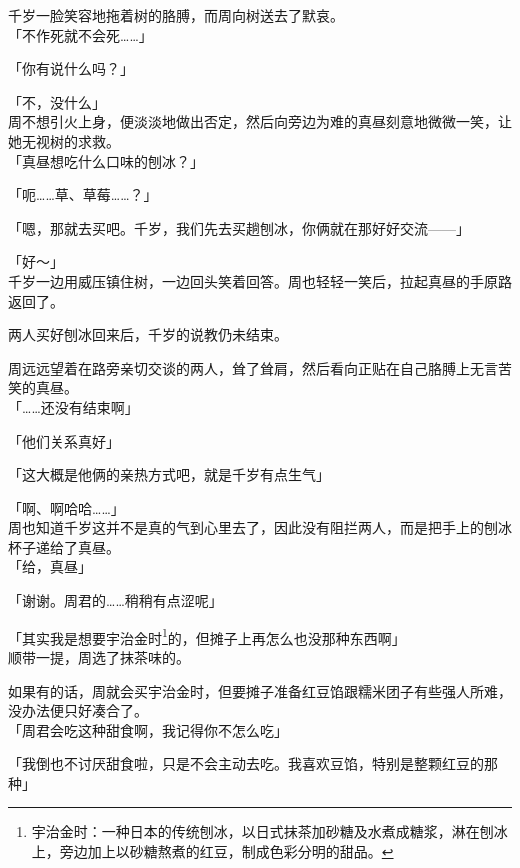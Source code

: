 千岁一脸笑容地拖着树的胳膊，而周向树送去了默哀。\\

「不作死就不会死……」

「你有说什么吗？」

「不，没什么」\\

周不想引火上身，便淡淡地做出否定，然后向旁边为难的真昼刻意地微微一笑，让她无视树的求救。\\

「真昼想吃什么口味的刨冰？」

「呃……草、草莓……？」

「嗯，那就去买吧。千岁，我们先去买趟刨冰，你俩就在那好好交流——」

「好～」\\

千岁一边用威压镇住树，一边回头笑着回答。周也轻轻一笑后，拉起真昼的手原路返回了。\\

\vspace{2\baselineskip}

两人买好刨冰回来后，千岁的说教仍未结束。

周远远望着在路旁亲切交谈的两人，耸了耸肩，然后看向正贴在自己胳膊上无言苦笑的真昼。\\

「……还没有结束啊」

「他们关系真好」

「这大概是他俩的亲热方式吧，就是千岁有点生气」

「啊、啊哈哈……」\\

周也知道千岁这并不是真的气到心里去了，因此没有阻拦两人，而是把手上的刨冰杯子递给了真昼。\\

「给，真昼」

「谢谢。周君的……稍稍有点涩呢」

「其实我是想要宇治金时\footnote{宇治金时：一种日本的传统刨冰，以日式抹茶加砂糖及水煮成糖浆，淋在刨冰上，旁边加上以砂糖熬煮的红豆，制成色彩分明的甜品。}的，但摊子上再怎么也没那种东西啊」\\

顺带一提，周选了抹茶味的。

如果有的话，周就会买宇治金时，但要摊子准备红豆馅跟糯米团子有些强人所难，没办法便只好凑合了。\\

「周君会吃这种甜食啊，我记得你不怎么吃」

「我倒也不讨厌甜食啦，只是不会主动去吃。我喜欢豆馅，特别是整颗红豆的那种」\\

